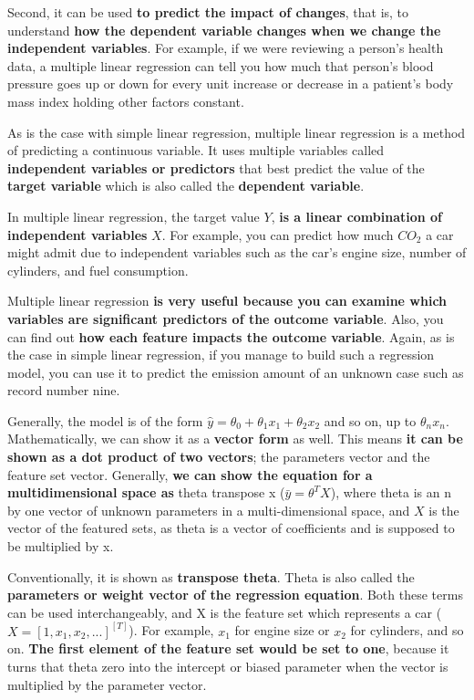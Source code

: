 	Second, it can be used \textbf{to predict the impact of changes}, that is, to understand \textbf{how the dependent variable changes when we change the independent variables}. For example, if we were reviewing a person's health data, a multiple linear regression can tell you how much that person's blood pressure goes up or down for every unit increase or decrease in a patient's body mass index holding other factors constant. 
	
	As is the case with simple linear regression, multiple linear regression is a method of predicting a continuous variable. It uses multiple variables called \textbf{independent variables or predictors} that best predict the value of the \textbf{target variable} which is also called the \textbf{dependent variable}.
	
	In multiple linear regression, the target value $Y$, \textbf{is a linear combination of independent variables} $X$. For example, you can predict how much $CO_2$ a car might admit due to independent variables such as the car's engine size, number of cylinders, and fuel consumption. 
	
	Multiple linear regression \textbf{is very useful because you can examine which variables are significant predictors of the outcome variable}. Also, you can find out \textbf{how each feature impacts the outcome variable}. Again, as is the case in simple linear regression, if you manage to build such a regression model, you can use it to predict the emission amount of an unknown case such as record number nine. 
	
	Generally, the model is of the form $\hat{y} = \theta_{0} + \theta_{1}x_{1} +\theta_{2}x_{2}$ and so on, up to $\theta_{n}x_{n}$. Mathematically, we can show it as a \textbf{vector form} as well. This means \textbf{it can be shown as a dot product of two vectors}; the parameters vector and the feature set vector. Generally, \textbf{we can show the equation for a multidimensional space as} theta transpose x ($\bar{y} = \theta^{T}X$), where theta is an n by one vector of unknown parameters in a multi-dimensional space, and $X$ is the vector of the featured sets, as theta is a vector of coefficients and is supposed to be multiplied by x. 
	
	Conventionally, it is shown as \textbf{transpose theta}. Theta is also called the \textbf{parameters or weight vector of the regression equation}. Both these terms can be used interchangeably, and X is the feature set which represents a car ($X = [1,x_1,x_2,... ]^[T]$). For example, $x_1$ for engine size or $x_2$ for cylinders, and so on. \textbf{The first element of the feature set would be set to one}, because it turns that theta zero into the intercept or biased parameter when the vector is multiplied by the parameter vector.
	
